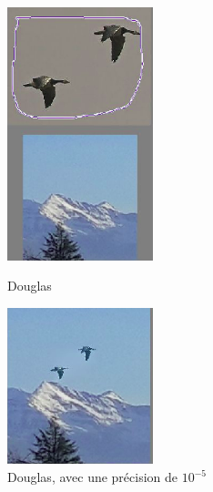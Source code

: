 \begin{figure}[!htb]
   \begin{minipage}{0.5\textwidth}
     \centering
     \includegraphics[width = 120pt]{Images/Resultats/OiseauMont.png}
     \caption{Douglas}
      \end{minipage}\hfill
   \begin{minipage}{0.5\textwidth}
     \centering
     \includegraphics[width = 120pt]{Images/Resultats/Douglas2.png}
     \caption{Douglas, avec une précision de $10^{-5}$}
      \end{minipage}\hfill
\end{figure}

